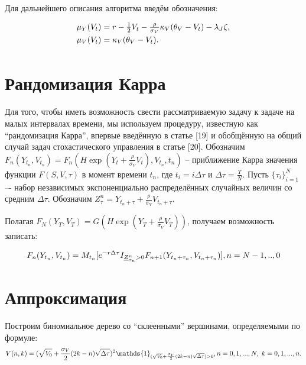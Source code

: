 \documentclass[draft, 12pt]{article}
\begin{document}
Для дальнейшего описания алгоритма введём обозначения:

\begin{equation*}
\begin{array}{l}
\mu_Y(V_t) = r - \frac{1}{2}V_t - \frac{\rho}{\sigma_V}\kappa_V(\theta_V - V_t)  - \lambda_J \zeta,
\smallskip\\
\mu_V(V_t) = \kappa_V(\theta_V - V_t).
\smallskip\\
\end{array}
\end{equation*}

\section{Рандомизация Карра}
Для того, чтобы иметь возможность свести рассматриваемую задачу к задаче на малых интервалах времени, мы используем процедуру, известную как ``рандомизация Карра'', впервые введённую в статье [19] и обобщённую на общий случай задач стохастического управления в статье [20]. Обозначим $F_{n}({Y}_{t_n}, {V}_{t_n}) = F_{n}(H\exp(Y_t + \frac{\rho}{\sigma_V}V_t), {V}_{t_n}, t_n)$ -- приближение Карра значения функции $F(S,V,\tau)$ в момент времени $t_n$, где $t_i = i \Delta \tau$ и $\Delta \tau = \frac{T}{N}$. Пусть $\{\tau_i\}_{i=1}^N$ –- набор независимых экспоненциально распределённых случайных величин со средним $\Delta \tau$. Обозначим $Z_\tau^n=Y_{t_n + \tau}+\frac{\rho}{\sigma_V}V_{t_n + \tau}$.

Полагая $F_{N}(Y_T, V_T)=G(H\exp (Y_T+\frac{\rho}{\sigma_V}V_T ))$, получаем возможность записать:

$$
F_{n}({Y}_{t_n}, {V}_{t_n}) = M_{t_{n}} [ e^{-r\Delta \tau}  
I_{\underline{Z}^n_{\tau_n} > 0} F_{n+1}(Y_{t_n+\tau_n},V_{t_n+\tau_n})], \smallskip\\ n = N-1,..,0 
$$

\section{Аппроксимация}

Построим  биномиальное дерево со ``склеенными'' вершинами, определяемыми по формуле:
\begin{equation*}	
V(n,k) = (\sqrt{V_0} + \frac{\sigma_V}{2}(2k-n)\sqrt{\Delta \tau})^2 \mathds{1}_{(\sqrt{V_0} + \frac{\sigma_V}{2}(2k-n)\sqrt{\Delta \tau}) > 0}, 
\\ n = 0,1,...,N, \; k = 0,1,...,n.
\end{equation*}
\end{document}
